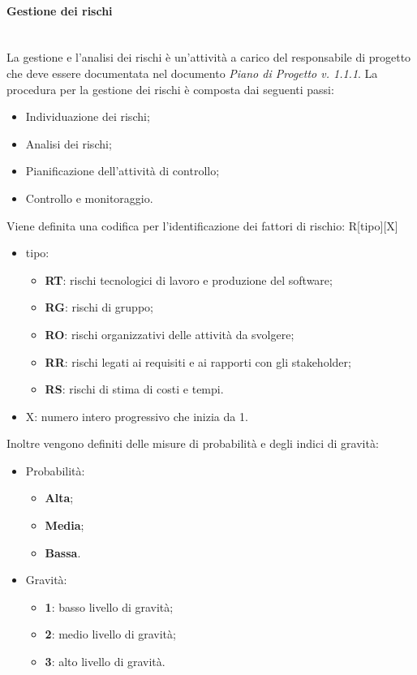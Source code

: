 			\paragraph{Gestione dei rischi}\mbox{}\\ [1mm]
				La gestione e l'analisi dei rischi è un'attività a carico del responsabile di progetto che deve essere documentata nel documento \textit{Piano di Progetto v. 1.1.1}.
				La procedura per la gestione dei rischi è composta dai seguenti passi:
				\begin{itemize}
					\item Individuazione dei rischi;
					\item Analisi dei rischi;
					\item Pianificazione dell'attività di controllo;
					\item Controllo e monitoraggio.
				\end{itemize}
				Viene definita una codifica per l'identificazione dei fattori di rischio: R[tipo][X]
				\begin{itemize}
					\item tipo:
					\begin{itemize}
						\item \textbf{RT}: rischi tecnologici di lavoro e produzione del software;
						\item \textbf{RG}: rischi di gruppo;
						\item \textbf{RO}: rischi organizzativi delle attività da svolgere;
						\item \textbf{RR}: rischi legati ai requisiti e ai rapporti con gli stakeholder;
						\item \textbf{RS}: rischi di stima di costi e tempi.
					\end{itemize}
					\item X: numero intero progressivo che inizia da 1.
				\end{itemize}
				Inoltre vengono definiti delle misure di probabilità e degli indici di gravità:
				\begin{itemize}
					\item Probabilità:
					\begin{itemize}
						\item \textbf{Alta};
						\item \textbf{Media};
						\item \textbf{Bassa}.
					\end{itemize}
					\item Gravità:
					\begin{itemize}
						\item \textbf{1}: basso livello di gravità;
						\item \textbf{2}: medio livello di gravità;
						\item \textbf{3}: alto livello di gravità.
					\end{itemize}
				\end{itemize}
